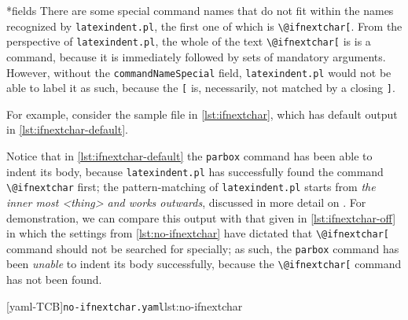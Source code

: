 *{fields}
	There are some special command names%
	 that do not fit within the names recognized by \texttt{latexindent.pl},
	the first one of which is \lstinline!\@ifnextchar[!. From the perspective of \texttt{latexindent.pl}, the whole of the
	text \lstinline!\@ifnextchar[! is is a command, because it is
	immediately followed by sets of mandatory arguments. However, without the \texttt{commandNameSpecial} field, \texttt{latexindent.pl}
	would not be able to label it as such, because the \lstinline![! is, necessarily, not matched by a closing \lstinline!]!.

	For example, consider the sample file in \cref{lst:ifnextchar}, which has default output in \cref{lst:ifnextchar-default}.

	\begin{minipage}{.45\textwidth}
	\end{minipage}
	\hfill
	\begin{minipage}{.45\textwidth}
	\end{minipage}

	Notice that in \cref{lst:ifnextchar-default} the \texttt{parbox} command has been able to indent its body, because \texttt{latexindent.pl}
	has successfully found the command \lstinline!\@ifnextchar! first; the pattern-matching of \texttt{latexindent.pl} starts from
	\emph{the inner most <thing> and works outwards}, discussed in more detail on .  For demonstration, we can compare
	this output with that given in \cref{lst:ifnextchar-off} in which
	the settings from \cref{lst:no-ifnextchar} have dictated that \lstinline!\@ifnextchar[! command should not be searched for specially;
	as such, the \texttt{parbox} command has been \emph{unable} to indent its body successfully, because the \lstinline!\@ifnextchar[!
	command has not been found.

	\begin{minipage}{.45\textwidth}
	\end{minipage}
	\hfill
	\begin{minipage}{.45\textwidth}
		[yaml-TCB]{\texttt{no-ifnextchar.yaml}}{lst:no-ifnextchar}
	\end{minipage}
